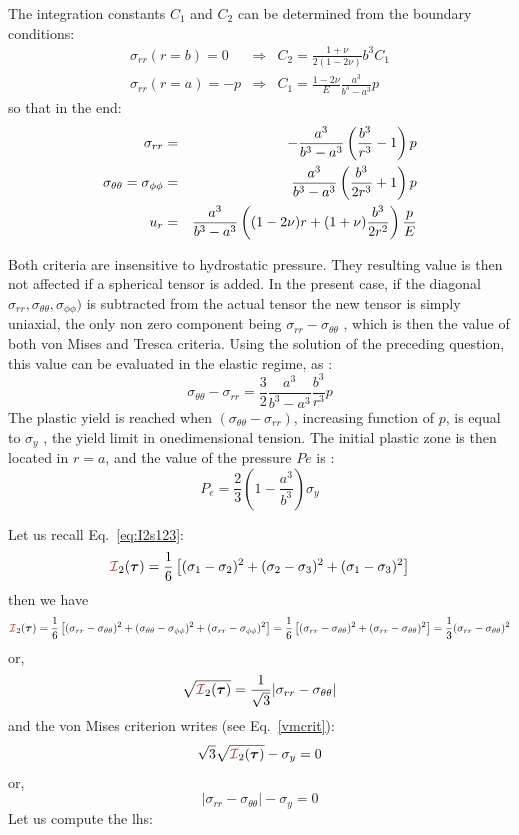 The integration constants $C_1$ and $C_2$ can be determined from the boundary conditions:
\begin{eqnarray}
\sigma_{rr}(r=b)=0 &\Rightarrow& 
C_2=\frac{1+\nu}{2(1-2\nu)}b^3 C_1 \\
\sigma_{rr}(r=a)=-p &\Rightarrow& 
C_1=\frac{1-2\nu}{E}\frac{a^3}{b^3-a^3}p
\end{eqnarray}
so that in the end:
\begin{eqnarray}
\sigma_{rr} &=& -\frac{a^3}{b^3-a^3} \left( \frac{b^3}{r^3}-1 \right) p \nonumber\\
\sigma_{\theta\theta}=\sigma_{\phi\phi} &=& \frac{a^3}{b^3-a^3} \left( \frac{b^3}{2r^3}+1 \right) p \nonumber\\
u_r &=& \frac{a^3}{b^3-a^3}
\left( (1-2\nu)r+(1+\nu)\frac{b^3}{2r^2}  \right)\frac{p}{E}
\end{eqnarray}

Both criteria are insensitive to hydrostatic pressure. They resulting value is 
then not affected if a
spherical tensor is added. In the present case, if the 
diagonal $\sigma_{rr},\sigma_{\theta\theta},\sigma_{\phi\phi})$ is subtracted from the actual
tensor the new tensor is simply uniaxial, the only non zero component 
being $\sigma_{rr}-\sigma_{\theta\theta}$ , which is then
the value of both von Mises and Tresca criteria. Using the solution 
of the preceding question, this value
can be evaluated in the elastic regime, as :
\[
\sigma_{\theta\theta} - \sigma_{rr} = \frac32 \frac{a^3}{b^3-a^3} \frac{b^3}{r^3} p
\]
The plastic yield is reached when $(\sigma_{\theta\theta} - \sigma_{rr})$, 
increasing function of $p$, is equal to $\sigma_y$ , the yield limit
in onedimensional tension. The initial plastic zone is then located in $r=a$, 
and the value of the pressure $Pe$ is :
\[
P_e = \frac23 \left( 1 - \frac{a^3}{b^3} \right)\sigma_y
\]

Let us recall Eq.~\eqref{eq:I2s123}:
\[ 
{\III}_2({\bm \tau}) = \frac{1}{6}\left[(\sigma_{1}-\sigma_{2})^2 + (\sigma_{2}-\sigma_{3})^2 
+ (\sigma_{1}-\sigma_{3})^2 \right] 
\]
then we have
\[ 
{\III}_2({\bm \tau}) 
= \frac{1}{6}\left[(\sigma_{rr}-\sigma_{\theta\theta})^2 
+ (\sigma_{\theta\theta}-\sigma_{\phi\phi})^2 
+ (\sigma_{rr}-\sigma_{\phi\phi})^2 \right] 
=
\frac{1}{6}\left[(\sigma_{rr}-\sigma_{\theta\theta})^2 
+ (\sigma_{rr}-\sigma_{\theta\theta})^2 \right] 
=\frac13 (\sigma_{rr}-\sigma_{\theta\theta})^2 
\]
or, 
\[
\sqrt{{\III}_2({\bm \tau}) } = \frac{1}{\sqrt{3}} |\sigma_{rr}-\sigma_{\theta\theta}|
\]
and the von Mises criterion writes (see Eq.~\eqref{vmcrit}):
\[
\sqrt{3} \sqrt{{\III}_2({\bm \tau}) } - \sigma_y = 0
\]
or,
\[
|\sigma_{rr}-\sigma_{\theta\theta}|
- \sigma_y = 0
\]
Let us compute the lhs:

